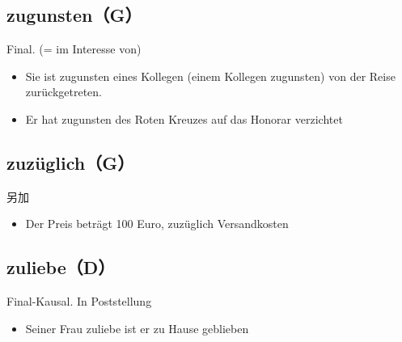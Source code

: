 \documentclass[UTF8]{report}
\begin{document}
\subsection{zugunsten（G）}
Final. (= im Interesse von)
\begin{itemize}
    \item Sie ist zugunsten eines Kollegen (einem Kollegen zugunsten) von der Reise zurückgetreten.
    \item Er hat zugunsten des Roten Kreuzes auf das Honorar verzichtet
\end{itemize}

\subsection{zuzüglich（G）}
另加
\begin{itemize}
    \item Der Preis beträgt 100 Euro, zuzüglich Versandkosten
\end{itemize}
\subsection{zuliebe（D）}
Final-Kausal. In Poststellung

\begin{itemize}
    \item Seiner Frau zuliebe ist er zu Hause geblieben
\end{itemize}
\end{document}
